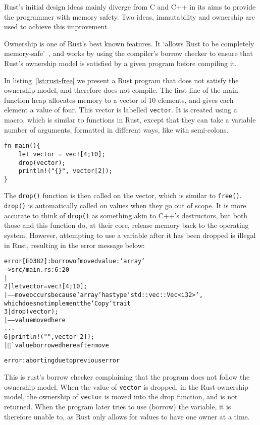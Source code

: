 Rust's initial design ideas mainly diverge from C and C++ in its aims to provide the programmer with memory safety. Two ideas, immutability and ownership are used to achieve this improvement. 

Ownership is one of Rust's best known features. It `allows Rust to be completely memory-safe'~\cite{NomOwner}, and works by using the compiler's borrow checker to ensure that Rust's ownership model is satisfied by a given program before compiling it.

In listing~\ref{lst:rust-free} we present a Rust program that does not satisfy the ownership model, and therefore does not compile. The first line of the main function heap allocates memory to a vector of 10 elements, and gives each element a value of four. This vector is labelled \texttt{vector}. It is created using a macro, which is similar to functions in Rust, except that they can take a variable number of arguments, formatted in different ways, like with semi-colons.

\begin{code}
\begin{verbatim}
fn main(){
    let vector = vec![4;10];
    drop(vector);
    println!("{}", vector[2]);
}
\end{verbatim}
\label{lst:rust-free}
\end{code}

The \texttt{drop()} function is then called on the vector, which is similar to \texttt{free()}. \texttt{drop()} is automatically called on values when they go out of scope. It is more accurate to think of \texttt{drop()} as something akin to C++'s destructors, but both those and this function do, at their core, release memory back to the operating system. However, attempting to use a variable after it has been dropped is illegal in Rust, resulting in the error message below:

\begin{alltt}
\scriptsize
error[E0382]: borrow of moved value: `array`
 --> src/main.rs:6:20
  |
2 |     let vector = vec![4;10];
  |         ----- move occurs because `array` has type `std::vec::Vec<i32>`,
  which does not implement the `Copy` trait
3 |     drop(vector);
  |          ----- value moved here
...
6 |     println!("{}", vector[2]);
  |                    ^^^^^ value borrowed here after move

error: aborting due to previous error
\end{alltt}

This is rust's borrow checker complaining that the program does not follow the ownership model. When the value of \texttt{vector} is dropped, in the Rust ownership model, the ownership of \texttt{vector} is moved into the drop function, and is not returned. When the program later tries to use (borrow) the variable, it is therefore unable to, as Rust only allows for values to have one owner at a time.


